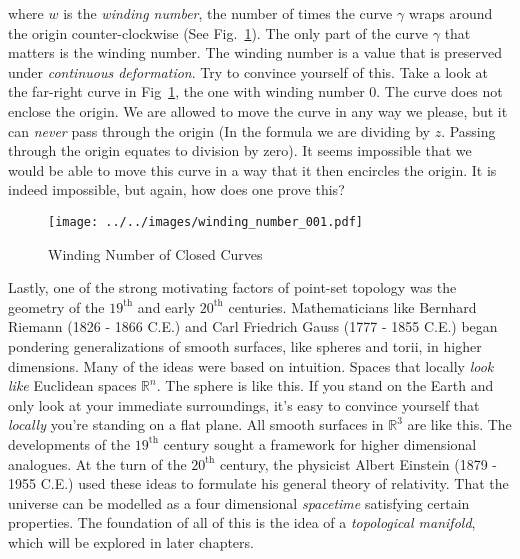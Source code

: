     where $w$ is the \textit{winding number}, the number of times the curve
    $\gamma$ wraps around the origin counter-clockwise
    (See Fig.~\ref{fig:winding_number_001}). The only part of the curve
    $\gamma$ that matters is the winding number. The winding number is a value
    that is preserved under \textit{continuous deformation}. Try to convince
    yourself of this. Take a look at the far-right curve in
    Fig~\ref{fig:winding_number_001}, the one with winding number 0. The curve
    does not enclose the origin. We are allowed to move the curve in any way
    we please, but it can \textit{never} pass through the origin
    (In the formula we are dividing by $z$. Passing through the origin equates
    to division by zero). It seems impossible that we would be able to move this
    curve in a way that it then encircles the origin. It is indeed impossible,
    but again, how does one prove this?
    \begin{figure}
        \centering
        \texttt{[image: ../../images/winding\_number\_001.pdf]}
        \caption{Winding Number of Closed Curves}
        \label{fig:winding_number_001}
    \end{figure}
    \par\hfill\par
    Lastly, one of the strong motivating factors of point-set topology was
    the geometry of the $19^{\textrm{th}}$ and early
    $20^{\textrm{th}}$ centuries. Mathematicians like
    Bernhard Riemann (1826 - 1866 C.E.) and Carl Friedrich Gauss
    (1777 - 1855 C.E.) began pondering generalizations of smooth surfaces,
    like spheres and torii, in higher dimensions. Many of the ideas were based
    on intuition. Spaces that locally \textit{look like} Euclidean spaces
    $\mathbb{R}^{n}$. The sphere is like this. If you stand on the Earth and
    only look at your immediate surroundings, it's easy to convince yourself
    that \textit{locally} you're standing on a flat plane. All smooth surfaces
    in $\mathbb{R}^{3}$ are like this. The developments of the
    $19^{\textrm{th}}$ century sought a framework for higher dimensional
    analogues. At the turn of the $20^{\textrm{th}}$ century, the physicist
    Albert Einstein (1879 - 1955 C.E.) used these ideas to formulate his
    general theory of relativity. That the universe can be modelled as a
    four dimensional \textit{spacetime} satisfying certain properties. The
    foundation of all of this is the idea of a \textit{topological manifold},
    which will be explored in later chapters.
